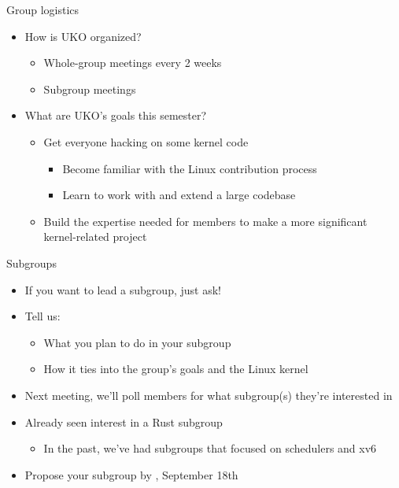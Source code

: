 \documentclass[aspectratio=169, notes]{beamer}
\begin{document}
\begin{frame}{Group logistics}
	\begin{itemize}
	\item How is UKO organized?
		\begin{itemize}
		\item Whole-group meetings every 2 weeks
		\item Subgroup meetings
		\end{itemize}
	\item What are UKO's goals this semester?
		\begin{itemize}
		\item Get everyone hacking on some kernel code
			\begin{itemize}
			\item Become familiar with the Linux contribution process
			\item Learn to work with and extend a large codebase
			\end{itemize}
		\item Build the expertise needed for members to make a more significant kernel-related project
		\end{itemize}
	\end{itemize}
\end{frame}

\begin{frame}{Subgroups}
	\begin{itemize}
	\item If you want to lead a subgroup, just ask!
	\item Tell us:
		\begin{itemize}
		\item What you plan to do in your subgroup
		\item How it ties into the group's goals and the Linux kernel
		\end{itemize}
	\item Next meeting, we'll poll members for what subgroup(s) they're interested in
	\item Already seen interest in a Rust subgroup
		\begin{itemize}
		\item In the past, we've had subgroups that focused on schedulers and xv6
		\end{itemize}
	\item Propose your subgroup by , September 18th
	\end{itemize}
\end{frame}
\end{document}
